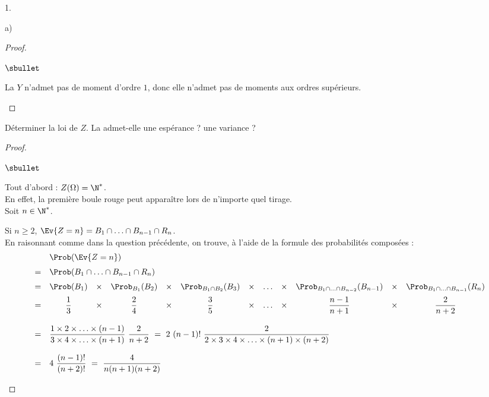 \begin{noliste}{1.}
\begin{noliste}{a)}
\begin{proof}
\begin{noliste}{$\sbullet$}
      \item La \var $Y$ n'admet pas de moment d'ordre $1$, donc elle
        n'admet pas de moments aux ordres supérieurs. %
        ~\\[-1.2cm]
      \end{noliste}
    \end{proof}
  \end{noliste}

\item Déterminer la loi de $Z$. La \var admet-elle une espérance ? une
  variance ?
 
  \begin{proof}~    
    \begin{noliste}{$\sbullet$}
    \item Tout d'abord : $Z(\Omega) = \N^*$.\\
      En effet, la première boule rouge peut apparaître lors de
      n'importe quel tirage.\\
      Soit $n \in \N^*$.
    \item Si $n \geq 2$, $\Ev{Z = n} = B_1 \cap \ldots \cap B_{n-1}
      \cap R_n$.\\
      En raisonnant comme dans la question précédente, on trouve, à
      l'aide de la formule des probabilités composées :
      \[
      \begin{array}{cccccccccccc}
        & \multicolumn{11}{l}{\Prob(\Ev{Z = n})} \\[.2cm]
        = & \multicolumn{11}{l}{\Prob(B_1 \cap \ldots \cap B_{n-1}
          \cap R_n)} \\[.2cm] 
        = & \Prob(B_1) & \times & \Prob_{B_1}(B_2) & \times & \Prob_{B_1
          \cap B_2}(B_3) & \times & \ldots & \times & \Prob_{B_1 \cap 
	  \ldots
          \cap B_{n-2}}(B_{n-1}) & \times & \Prob_{B_1 \cap \ldots \cap
          B_{n-1}}(R_n) \\[.2cm]
        = & \dfrac{1}{3} & \times & \dfrac{2}{4} & \times & 
        \dfrac{3}{5} & \times & \ldots & \times & \dfrac{n-1}{n+1} & 
	\times &
        \dfrac{2}{n+2} \\[.6cm]
        = & \multicolumn{11}{l}{
          \dfrac{1 \times 2 \times \ldots \times
            (n-1)}{3 \times 4 \times \ldots \times (n+1)} \
          \dfrac{2}{n+2} \ = \ 2 \ (n-1)! \ \dfrac{2}{2 \times 3
            \times 4 \times \ldots \times (n+1) \times (n+2)}  
        } \\[.6cm]
        = & \multicolumn{11}{l}{
          4 \ \dfrac{(n-1)!}{(n+2)!} \ = \ \dfrac{4}{n(n+1)(n+2)}
        }
      \end{array}         
      \]
      

\end{noliste}
\end{proof}
\end{noliste}
